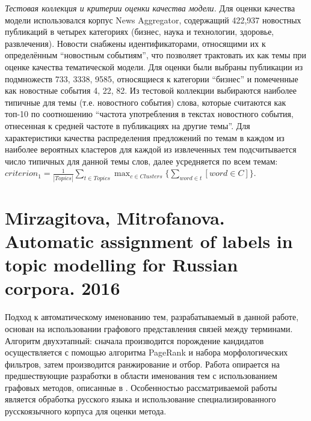\textit{Тестовая коллекция и критерии оценки качества модели.} Для оценки качества модели использовался корпус News Aggregator, содержащий 422,937 новостных публикаций в четырех категориях (бизнес, наука и технологии, здоровье, развлечения). Новости снабжены идентификаторами, относящими их к определённым ``новостным событиям'', что позволяет трактовать их как темы при оценке качества тематической модели. Для оценки были выбраны публикации из подмножеств 733, 3338, 9585, относящиеся к категории ``бизнес'' и помеченные как новостные события 4, 22, 82.
Из тестовой коллекции выбираются наиболее типичные для темы (т.е. новостного события) слова, которые считаются как топ-10 по соотношению ``частота употребления в текстах новостного события, отнесенная к средней частоте в публикациях на другие темы''. Для характеристики качества распределения предложений по темам в каждом из наиболее вероятных кластеров для каждой из извлеченных тем подсчитывается число типичных для данной темы слов, далее усредняется по всем темам: $criterion_1 = \frac{1}{|Topics|}\sum_{t \in Topics}\max_{c \in Clusters}\{\sum_{word \in t}[word \in C]\}$.






\section{Mirzagitova, Mitrofanova. Automatic assignment of labels in topic modelling for Russian corpora. 2016}

Подход к автоматическому именованию тем, разрабатываемый в данной работе, основан на использовании графового представления связей между терминами. Алгоритм двухэтапный: сначала производится порождение кандидатов осуществляется с помощью алгоритма PageRank и набора морфологических фильтров, затем производится ранжирование и отбор. Работа опирается на предшествующие разработки в области именования тем с использованием графовых методов, описанные в \parencite{aletras2014labelling}. Особенностью рассматриваемой работы является обработка русского языка и использование специализированного русскоязычного корпуса для оценки метода.

